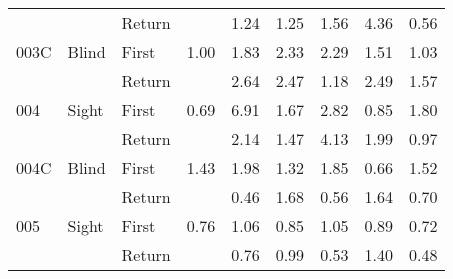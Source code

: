 \begin{table}[!htb]
\begin{tabular}{lllrrrrrr}
    &       & Return &          &   1.24 &   1.25 &                                                  1.56 &                                                   4.36 &    0.56 \\
003C & Blind & First &     1.00 &   1.83 &   2.33 &                                                  2.29 &                                                   1.51 &    1.03 \\
    &       & Return &          &   2.64 &   2.47 &                                                  1.18 &                                                   2.49 &    1.57 \\
004 & Sight & First &     0.69 &   6.91 &   1.67 &                                                  2.82 &                                                   0.85 &    1.80 \\
    &       & Return &          &   2.14 &   1.47 &                                                  4.13 &                                                   1.99 &    0.97 \\
004C & Blind & First &     1.43 &   1.98 &   1.32 &                                                  1.85 &                                                   0.66 &    1.52 \\
    &       & Return &          &   0.46 &   1.68 &                                                  0.56 &                                                   1.64 &    0.70 \\
005 & Sight & First &     0.76 &   1.06 &   0.85 &                                                  1.05 &                                                   0.89 &    0.72 \\
    &       & Return &          &   0.76 &   0.99 &                                                  0.53 &                                                   1.40 &    0.48 \\
\bottomrule
\end{tabular}
\end{table}

